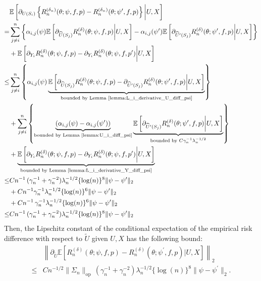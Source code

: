 \documentclass[12pt]{article}
\newcommand{\E}{\mathbb{E}}
\begin{document}
\begin{align*}
    &\E\left[\partial_{U(S_i)}\left\{R_n^{(\delta_n)}(\theta;\psi,f,p)-R_n^{({\delta_n})}(\theta;\psi^\prime,f,p)\right\}\bigg| U,X\right]\\
    = & \sum_{j\neq i}^n  \left\{\alpha_{i,j}(\psi)\E\left[\partial_{\widehat U(S_j)}R_n^{(\delta)}(\theta;\psi,f,p)\bigg| U,X\right]-\alpha_{i,j}(\psi^\prime)\E\left[\partial_{\widehat U^\prime(S_j)}R_n^{(\delta)}(\theta;\psi^\prime,f,p)\bigg| U,X\right]\right\}\\
    &+ \E\left[\partial_{Y_i}R_n^{(\delta)}(\theta;\psi,f,p)   - \partial_{Y_i}R_n^{(\delta)}(\theta;\psi,f,p^\prime)\bigg| U,X\right]\\
    \leq & \sum_{j\neq i}^n  \left\{\alpha_{i,j}(\psi)\underbrace{\E\left[\partial_{\widehat U(S_j)}R_n^{(\delta)}(\theta;\psi,f,p) - \partial_{\widehat U^\prime(S_j)}R_n^{(\delta)}(\theta;\psi^\prime,f,p)\bigg| U,X\right]}_{\text{bounded by Lemma \ref{lemma:L_i_derivative_U_diff_psi}}}\right\}\\
    & + \sum_{j\neq i}^n  \left\{\underbrace{\left(\alpha_{i,j}(\psi)-\alpha_{i,j}(\psi^\prime)\right)}_{\text{bounded by Lemma \ref{lemma:U_i_diff_psi}}}\underbrace{\E\left[\partial_{\widehat U^\prime(S_j)}R_n^{(\delta)}(\theta;\psi^\prime,f,p)\bigg| U,X\right]}_{\text{bounded by $C\gamma_n^{-1}\lambda_n^{-1/2}$}}\right\}\\
    & + \underbrace{\E\left[\partial_{Y_i}R_n^{(\delta)}(\theta;\psi,f,p)   - \partial_{Y_i}R_n^{(\delta)}(\theta;\psi,f,p^\prime)\bigg| U,X\right]}_{\text{bounded by Lemma \ref{lemma:L_i_derivative_Y_diff_psi}}}\\
    \leq & Cn^{-1}\,(\gamma_n^{-1}+\gamma_n^{-2})\lambda_n^{-1/2}\{\log(n)\}^8\|\psi - \psi^\prime\|_2\\
    & + Cn^{-1}\gamma_n^{-1}\lambda_n^{-1/2}\{\log(n)\}^6\|\psi - \psi^\prime\|_2\\
    & + Cn^{-1}\,\gamma_n^{-1}\lambda_n^{-1/2}\{\log(n)\}^6\|\psi - \psi^\prime\|_2\\
    \leq &  Cn^{-1}\,(\gamma_n^{-1}+\gamma_n^{-2})\lambda_n^{-1/2}\{\log(n)\}^8\|\psi - \psi^\prime\|_2
\end{align*}
Then, the Lipschitz constant of the conditional expectation of the empirical risk difference with respect to $\widetilde U$ given $U,X$ has the following bound:
\begin{align*}
    &\left\|\partial_{ \widetilde U}\E\left[R_n^{(\delta)}(\theta;\psi,f,p)-R_n^{(\delta)}(\theta;\psi^\prime,f,p)\bigg| U,X\right]\right\|_2\\
    \leq & Cn^{-1/2}\|\Sigma_n\|_{\mathrm{op}}\,(\gamma_n^{-1}+\gamma_n^{-2})\lambda_n^{-1/2}\{\log(n)\}^8\|\psi - \psi^\prime\|_2.
\end{align*}
\end{document}
